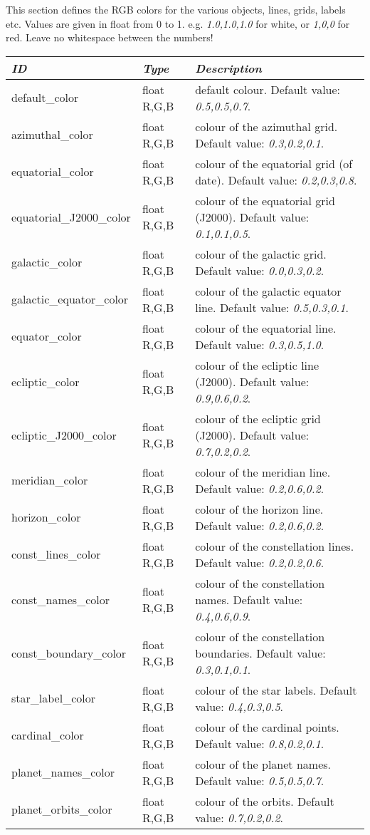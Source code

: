 This section defines the RGB colors for the various objects, lines,
grids, labels etc. Values are given in float from 0 to
1. e.g. \emph{1.0,1.0,1.0} for white, or \emph{1,0,0} for red. Leave
no whitespace between the numbers!

\begin{longtabu} to \textwidth {l|l|X}
\toprule
\emph{ID} & \emph{Type} & \emph{Description}\tabularnewline
\midrule
default\_color & float R,G,B & default colour.  Default value: \emph{0.5,0.5,0.7}. \tabularnewline
\midrule
azimuthal\_color & float R,G,B & colour of the azimuthal grid. Default value: \emph{0.3,0.2,0.1}.\tabularnewline
\midrule
equatorial\_color & float R,G,B & colour of the equatorial grid (of date). Default value: \emph{0.2,0.3,0.8}.\tabularnewline
\midrule
equatorial\_J2000\_color & float R,G,B & colour of the equatorial grid (J2000). Default value: \emph{0.1,0.1,0.5}.\tabularnewline
\midrule
galactic\_color & float R,G,B & colour of the galactic grid. Default value: \emph{0.0,0.3,0.2}.\tabularnewline
\midrule
galactic\_equator\_color & float R,G,B & colour of the galactic equator line. Default value: \emph{0.5,0.3,0.1}. \tabularnewline
\midrule
equator\_color & float R,G,B & colour of the equatorial line. Default value: \emph{0.3,0.5,1.0}. \tabularnewline
\midrule
ecliptic\_color & float R,G,B & colour of the ecliptic line (J2000). Default value: \emph{0.9,0.6,0.2}. \tabularnewline
\midrule
ecliptic\_J2000\_color & float R,G,B & colour of the ecliptic grid (J2000). Default value: \emph{0.7,0.2,0.2}. \tabularnewline
\midrule
meridian\_color & float R,G,B & colour of the meridian line. Default value: \emph{0.2,0.6,0.2}. \tabularnewline
\midrule
horizon\_color & float R,G,B & colour of the horizon line. Default value: \emph{0.2,0.6,0.2}. \tabularnewline
\midrule
const\_lines\_color & float R,G,B & colour of the constellation lines. Default value: \emph{0.2,0.2,0.6}. \tabularnewline
\midrule
const\_names\_color & float R,G,B & colour of the constellation names. Default value: \emph{0.4,0.6,0.9}. \tabularnewline
\midrule
const\_boundary\_color & float R,G,B & colour of the constellation boundaries. Default value: \emph{0.3,0.1,0.1}. \tabularnewline
\midrule
star\_label\_color & float R,G,B & colour of the star labels. Default value: \emph{0.4,0.3,0.5}. \tabularnewline
\midrule
cardinal\_color & float R,G,B &  colour of the cardinal points. Default value: \emph{0.8,0.2,0.1}. \tabularnewline
\midrule
planet\_names\_color & float R,G,B & colour of the planet names. Default value: \emph{0.5,0.5,0.7}. \tabularnewline
\midrule
planet\_orbits\_color & float R,G,B & colour of the orbits. Default value: \emph{0.7,0.2,0.2}. \tabularnewline

\end{longtabu}
